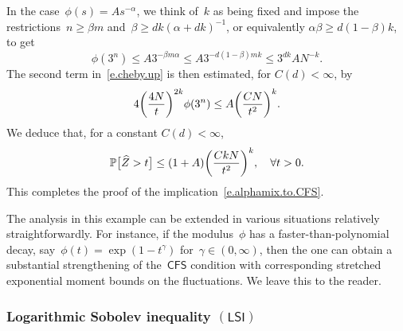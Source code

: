 \documentclass[11pt]{article} %
\numberwithin{equation}{section}
\theoremstyle{definition}
\let\originalleft\left
\let\originalright\right
\renewcommand{\left}{\mathopen{}\mathclose\bgroup\originalleft}
\renewcommand{\right}{\aftergroup\egroup\originalright}
\renewcommand*{\hat}{\widehat}
\renewcommand{\P}{\mathbb{P}}
\newcommand{\CFS}{\mathsf{CFS}}
\newcommand{\LSI}{\mathsf{LSI}}
\begin{document}
\smallskip

In the case~$\phi(s) = As^{-\alpha}$, we think of~$k$ as being fixed and impose the restrictions~$n \geq \beta m$ and~$\beta \geq dk( \alpha+dk)^{-1}$, or equivalently $\alpha \beta \geq d(1-\beta) k$, to get
\begin{equation*} \label{}
\phi(3^n ) 
\leq 
A 3^{-\beta m\alpha} 
\leq 
A 3^{-d(1-\beta)  mk} 
\leq 
3^{dk} A N^{-k}. 
\end{equation*}
The second term  in~\eqref{e.cheby.up} is then estimated, for $C(d)<\infty$, by
\begin{align*}
4 \left( \frac{4N}{t} \right)^{2k} \phi(3^n)
\leq
A \left( \frac{C N}{t^2} \right)^{k}. 
\end{align*}
We deduce that, for a constant $C(d)<\infty$,
\begin{equation*} \label{}
\P \bigl[ \hat{Z} > t \bigr] 
\leq 
(1+A) \left( \frac{CkN}{t^2} \right)^{k}, \quad \forall t>0. 
\end{equation*}
This completes the proof of the implication~\eqref{e.alphamix.to.CFS}.

\smallskip

The analysis in this example can be extended in various situations relatively straightforwardly. 
For instance, if the modulus~$\phi$ has a faster-than-polynomial decay, say~$\phi(t) = \exp( 1 - t^{\gamma} )$ for~$\gamma\in(0,\infty)$, then the one can obtain a substantial strengthening of the~$\CFS$ condition with corresponding stretched exponential moment bounds on the fluctuations. We leave this to the reader. 










\subsubsection{Logarithmic Sobolev inequality $(\LSI)$}
\label{ss.LSI}
\end{document}
